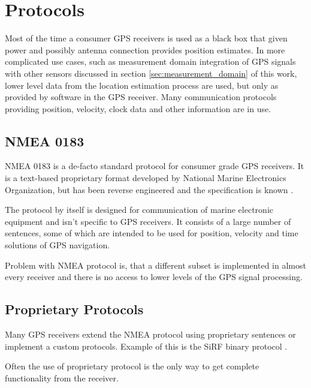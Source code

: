 

\section{Protocols}
Most of the time a consumer GPS receivers is used as a black box that given power and possibly antenna connection
provides position estimates.
In more complicated use cases, such as measurement domain integration of GPS signals with
other sensors discussed in section \ref{sec:measurement_domain} of this work,
lower level data from the location estimation process are used, but only as provided
by software in the GPS receiver.
Many communication protocols providing position, velocity, clock data
and other information are in use.

\subsection{NMEA 0183}
NMEA 0183 is a de-facto standard protocol for consumer grade GPS receivers.
It is a text-based proprietary format developed by National Marine Electronics Organization,
but has been reverse engineered and the specification is known \cite{depriest}.

The protocol by itself is designed for communication of marine electronic
equipment and isn't specific to GPS receivers.
It consists of a large number of sentences, some of which are intended to be used
for position, velocity and time solutions of GPS navigation.

Problem with NMEA protocol is, that a different subset is implemented in almost every
receiver and there is no access to lower levels of the GPS signal processing.

\subsection{Proprietary Protocols}
Many GPS receivers extend the NMEA protocol using proprietary sentences or
implement a custom protocols.
Example of this is the SiRF binary protocol \cite{sirf-protocol}.

Often the use of proprietary protocol is the only way to get complete functionality from
the receiver.

